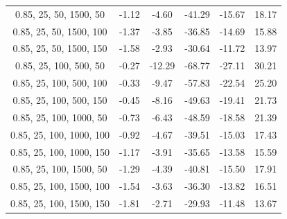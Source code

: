 \documentclass{article}
\begin{document}
\begin{table}[H]
{\begin{tabular}{|c|c|c|c|c|c|}
                0.85, 25, 50, 1500, 50     & -1.12                      & -4.60                      & -41.29                     & -15.67                   & 18.17                   \\
                0.85, 25, 50, 1500, 100    & -1.37                      & -3.85                      & -36.85                     & -14.69                   & 15.88                   \\
                0.85, 25, 50, 1500, 150    & -1.58                      & -2.93                      & -30.64                     & -11.72                   & 13.97                   \\
                0.85, 25, 100, 500, 50     & -0.27                      & -12.29                     & -68.77                     & -27.11                   & 30.21                   \\
                0.85, 25, 100, 500, 100    & -0.33                      & -9.47                      & -57.83                     & -22.54                   & 25.20                   \\
                0.85, 25, 100, 500, 150    & -0.45                      & -8.16                      & -49.63                     & -19.41                   & 21.73                   \\
                0.85, 25, 100, 1000, 50    & -0.73                      & -6.43                      & -48.59                     & -18.58                   & 21.39                   \\
                0.85, 25, 100, 1000, 100   & -0.92                      & -4.67                      & -39.51                     & -15.03                   & 17.43                   \\
                0.85, 25, 100, 1000, 150   & -1.17                      & -3.91                      & -35.65                     & -13.58                   & 15.59                   \\
                0.85, 25, 100, 1500, 50    & -1.29                      & -4.39                      & -40.81                     & -15.50                   & 17.91                   \\
                0.85, 25, 100, 1500, 100   & -1.54                      & -3.63                      & -36.30                     & -13.82                   & 16.51                   \\
                0.85, 25, 100, 1500, 150   & -1.81                      & -2.71                      & -29.93                     & -11.48                   & 13.67                   \\

\end{tabular}}
\end{table}
\end{document}
